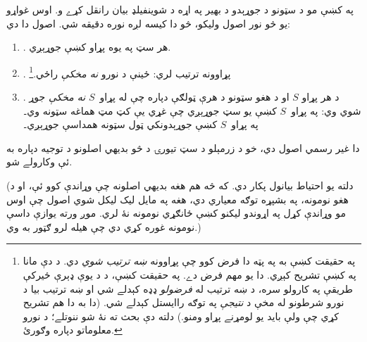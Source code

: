 \documentclass[../../../include/open-logic-section]{subfiles}
\begin{document}
	
په  کښې مو د سټونو د جوړېدو د بهير په اړه د
شوينفيلډ بيان رانقل کړے و. اوس غواړو يو څو نور اصول وليکو، څو دا
کيسه لږه نوره دقيقه شي. اصول دا دي:
\begin{enumerate}
\item[] \stageshier. هر سټ په يوه پړاو کښې جوړېږي.
\item[] \stagesord. پړاوونه ترتيب لري: ځينې د نورو \emph{نه مخکې}
راځي.\footnote{په حقيقت کښې به په پټه دا فرض کوو چې پړاوونه
\emph{ښه ترتيب شوي} دي. د دې مانا په 
کښې تشريح کېږي. دا يو مهم فرض دے. په حقيقت کښې، د \citet{Scott1974}
د يوې ډېرې ځيرکې طريقې په کارولو سره، د ښه ترتيب له
\emph{فرضولو} ډډه کېدلے شي او ښه ترتيب بيا د نورو شرطونو
له مخې د \emph{نتيجې} په توګه راايستل کېدلے شي. (دا به دا هم
تشريح کړي چې ولې بايد يو لومړنے پړاو ومنو.) دلته دې بحث ته نۀ شو
ننوتلے؛ د نورو معلوماتو دپاره \citet{ButtonLT1} وګورئ.}
\item[] \stagesacc. د هر پړاو $S$ او د هغو سټونو د هرې ټولګې
دپاره چې له پړاو~$S$ \emph{نه مخکې} جوړ شوي وي: په پړاو~$S$
کښې يو سټ جوړېږي چې غړي يې کټ مټ هماغه سټونه وي۔
په پړاو~$S$ کښې جوړېدونکي ټول سټونه همداسې جوړېږي۔
\end{enumerate}
دا غير رسمي اصول دي، خو د زرمېلو د سټ تيورۍ د څو بديهي اصلونو
د توجيه دپاره به ئې وکارولے شو.

(دلته يو احتياط بيانول پکار دي. که څه هم هغه بديهي اصلونه چې
وړاندې کوو ئې، او د هغو نومونه، په بشپړه توګه معياري دي، هغه په
مايل ليک ليکل شوي اصول چې اوس مو وړاندې کړل په اړوندو ليکنو کښې
ځانګړي نومونه نۀ لري. موږ ورته يوازې داسې نومونه غوره کړي دي
چې هيله لرو ګټور به وي.)
\end{document}
